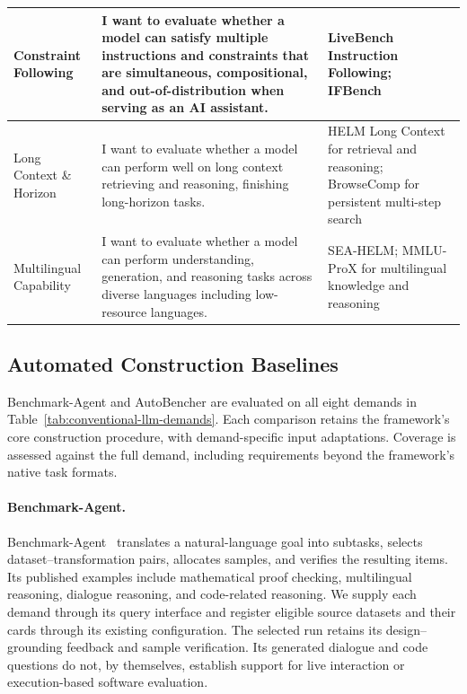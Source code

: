 \documentclass{article} %
\begin{document}
\begin{longtable}{@{}>{\raggedright\arraybackslash}p{}>{\raggedright\arraybackslash}p{}>{\raggedright\arraybackslash}p{}@{}}
		\midrule
		Constraint Following
		& I want to evaluate whether a model can satisfy multiple instructions and constraints that are simultaneous, compositional, and out-of-distribution when serving as an AI assistant.
		& LiveBench Instruction Following; IFBench~\citep{white2024livebench,pyatkin2025ifbench} \\
		
		\midrule
		Long Context \& Horizon
		& I want to evaluate whether a model can perform well on long context retrieving and reasoning, finishing long-horizon tasks.
		& HELM Long Context for retrieval and reasoning; BrowseComp for persistent multi-step search~\citep{helm2025longcontext,wei2025browsecomp} \\
		
		\midrule
		Multilingual Capability
		& I want to evaluate whether a model can perform understanding, generation, and
		reasoning tasks across diverse languages including low-resource languages.
		& SEA-HELM; MMLU-ProX for multilingual knowledge and reasoning~\citep{susanto2025seahelm,xuan2025mmluprox} \\
		
	\end{longtable}
	\endgroup
	
	\subsection{Automated Construction Baselines}
	\label{app:conventional-baselines}
	
	Benchmark-Agent and AutoBencher are evaluated on all eight demands in
	Table~\ref{tab:conventional-llm-demands}. Each comparison retains the framework's
	core construction procedure, with demand-specific input adaptations. Coverage
	is assessed against the full demand, including requirements beyond the
	framework's native task formats.
	
	\paragraph{Benchmark-Agent.}
	Benchmark-Agent~\citep{xiong2026benchmarkagent} translates a natural-language
	goal into subtasks, selects dataset--transformation pairs, allocates samples,
	and verifies the resulting items. Its published examples include mathematical
	proof checking, multilingual reasoning, dialogue reasoning, and code-related
	reasoning. We supply each demand through its query interface and register
	eligible source datasets and their cards through its existing configuration.
	The selected run retains its design--grounding feedback and sample verification.
	Its generated dialogue and code questions do not, by themselves, establish
	support for live interaction or execution-based software evaluation.
	
\end{document}

